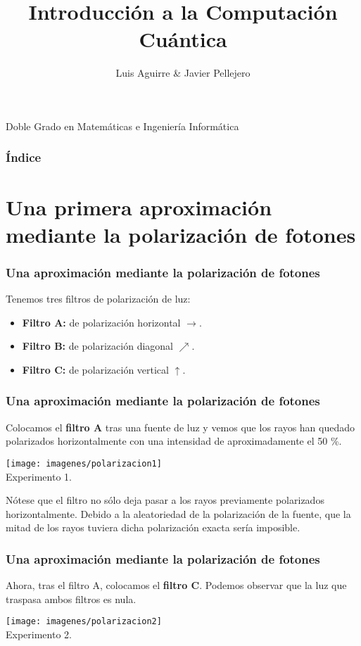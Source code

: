 \documentclass{beamer}
\title[Computación Cuántica]{Introducción a la Computación Cuántica}
\author{Luis Aguirre \& Javier Pellejero}
\institute[UCM]{Universidad Complutense de Madrid\\ Facultad de Informática}
\begin{document}
\begin{frame}
	\titlepage
	\begin{center} Doble Grado en Matemáticas e Ingeniería Informática\end{center}
\end{frame}

\begin{frame}
\frametitle{Índice}
	\tableofcontents
\end{frame}

\section{Una primera aproximación mediante la polarización de fotones}

\begin{frame}
	\frametitle{Una aproximación mediante la polarización de fotones}
	Tenemos tres filtros de polarización de luz:
	\begin{itemize}
		\item \textbf{Filtro A:} de polarización horizontal $\rightarrow$.
		\item \textbf{Filtro B:} de polarización diagonal $\nearrow$.
		\item \textbf{Filtro C:} de polarización vertical $\uparrow$.
	\end{itemize}
\end{frame}

\begin{frame}
	\frametitle{Una aproximación mediante la polarización de fotones}
	Colocamos el \textbf{filtro A} tras una fuente de luz y vemos que los rayos han quedado polarizados horizontalmente con una intensidad de aproximadamente el 50 \%.
	\begin{center}
	\texttt{[image: imagenes/polarizacion1]}\\
	Experimento 1.
	\end{center}
	Nótese que el filtro no sólo deja pasar a los rayos previamente polarizados horizontalmente. Debido a la aleatoriedad de la polarización de la fuente, que la mitad de los rayos tuviera dicha polarización exacta sería imposible.		
\end{frame}

\begin{frame}
	\frametitle{Una aproximación mediante la polarización de fotones}
	Ahora, tras el filtro A, colocamos el \textbf{filtro C}. Podemos observar que la luz que traspasa ambos filtros es nula.
	\begin{center}
	\texttt{[image: imagenes/polarizacion2]}\\
	Experimento 2.
	\end{center}		
\end{frame}
\end{document}
